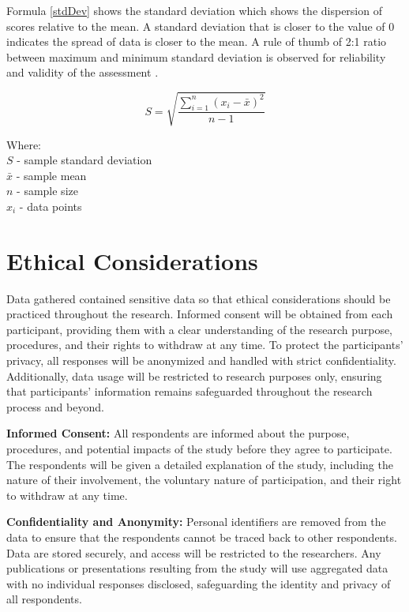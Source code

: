 	Formula \ref{stdDev} shows the standard deviation which shows the dispersion of scores relative to the mean. A standard deviation  that is closer to the value of 0 indicates the spread of data is closer to the mean.  A rule of thumb of 2:1 ratio between maximum and minimum standard deviation is observed for reliability and validity of the assessment \parencite{Yin2016}.
	
	\begin{equation} 
		\label{stdDev}
		S = \sqrt{\frac{\sum_{i=1}^{n} (x_{i} - \bar{x} )^2 }{n-1}}
	\end{equation}
	
	Where:
	\\$S$ - sample standard deviation
	\\$\bar{x}$ - sample mean
	\\$n$ - sample size
	\\$x_{i}$ - data points
	
	
	
	

\section{Ethical Considerations}
	Data gathered contained sensitive data so that ethical considerations should be practiced throughout the research.  Informed consent will be obtained from each participant, providing them with a clear understanding of the research purpose, procedures, and their rights to withdraw at any time. To protect the participants’ privacy, all responses will be anonymized and handled with strict confidentiality. Additionally, data usage will be restricted to research purposes only, ensuring that participants' information remains safeguarded throughout the research process and beyond. 
	
	\textbf{Informed Consent:} All respondents are informed about the purpose, procedures, and potential impacts of the study before they agree to participate. The respondents will be given a detailed explanation of the study, including the nature of their involvement, the voluntary nature of participation, and their right to withdraw at any time.
	
	\textbf{Confidentiality and Anonymity:} Personal identifiers are removed from the data to ensure that the respondents cannot be traced back to other respondents. Data are stored securely, and access will be restricted to the researchers. Any publications or presentations resulting from the study will use aggregated data with no individual responses disclosed, safeguarding the identity and privacy of all respondents.
	
